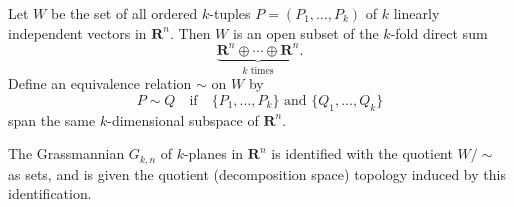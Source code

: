Let $W$ be the set of all ordered $k$-tuples $P = (P_1,\ldots,P_k)$ of $k$ linearly independent vectors in $\mathbf{R}^n$. Then $W$ is an open subset of the $k$-fold direct sum
\[
\underbrace{\mathbf{R}^n \oplus \cdots \oplus \mathbf{R}^n}_{k \text{ times}}.
\]
Define an equivalence relation $\sim$ on $W$ by
\[
P \sim Q \quad \text{if} \quad \{P_1,\ldots,P_k\} \text{ and } \{Q_1,\ldots,Q_k\}
\]
span the same $k$-dimensional subspace of $\mathbf{R}^n$.

The Grassmannian $G_{k,n}$ of $k$-planes in $\mathbf{R}^n$ is identified with the quotient $W / {\sim}$ as sets, and is given the quotient (decomposition space) topology induced by this identification.
